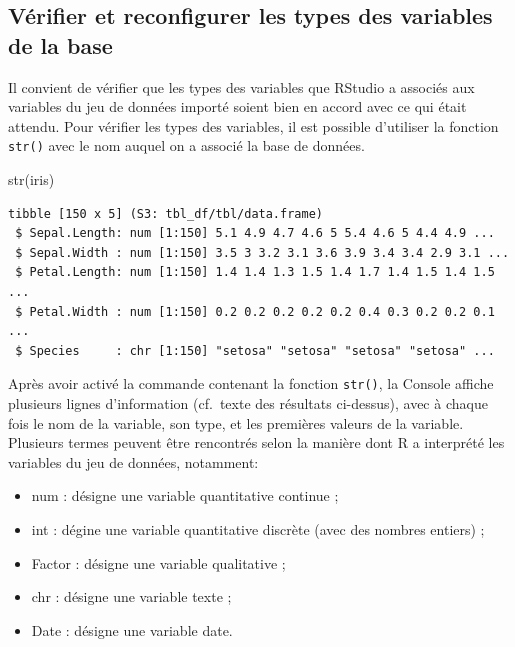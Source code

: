 \documentclass[
  letterpaper,
]{book}
\newenvironment{Shaded}{\begin{snugshade}}{\end{snugshade}}
\newcommand{\FunctionTok}[1]{\textcolor[rgb]{0.28,0.35,0.67}{#1}}
\newcommand{\NormalTok}[1]{\textcolor[rgb]{0.00,0.23,0.31}{#1}}
\providecommand{\tightlist}{%
  \setlength{\itemsep}{0pt}\setlength{\parskip}{0pt}}\usepackage{longtable,booktabs,array}
\begin{document}
\subsection{Vérifier et reconfigurer les types des variables de la
base}\label{vuxe9rifier-et-reconfigurer-les-types-des-variables-de-la-base}

Il convient de vérifier que les types des variables que RStudio a
associés aux variables du jeu de données importé soient bien en accord
avec ce qui était attendu. Pour vérifier les types des variables, il est
possible d'utiliser la fonction \texttt{str()} avec le nom auquel on a
associé la base de données.

\begin{Shaded}
\begin{Highlighting}[]
\FunctionTok{str}\NormalTok{(iris)}
\end{Highlighting}
\end{Shaded}

\begin{verbatim}
tibble [150 x 5] (S3: tbl_df/tbl/data.frame)
 $ Sepal.Length: num [1:150] 5.1 4.9 4.7 4.6 5 5.4 4.6 5 4.4 4.9 ...
 $ Sepal.Width : num [1:150] 3.5 3 3.2 3.1 3.6 3.9 3.4 3.4 2.9 3.1 ...
 $ Petal.Length: num [1:150] 1.4 1.4 1.3 1.5 1.4 1.7 1.4 1.5 1.4 1.5 ...
 $ Petal.Width : num [1:150] 0.2 0.2 0.2 0.2 0.2 0.4 0.3 0.2 0.2 0.1 ...
 $ Species     : chr [1:150] "setosa" "setosa" "setosa" "setosa" ...
\end{verbatim}

Après avoir activé la commande contenant la fonction \texttt{str()}, la
Console affiche plusieurs lignes d'information (cf.~texte des résultats
ci-dessus), avec à chaque fois le nom de la variable, son type, et les
premières valeurs de la variable. Plusieurs termes peuvent être
rencontrés selon la manière dont R a interprété les variables du jeu de
données, notamment:

\begin{itemize}
\tightlist
\item
  num : désigne une variable quantitative continue ;
\item
  int : dégine une variable quantitative discrète (avec des nombres
  entiers) ;
\item
  Factor : désigne une variable qualitative ;
\item
  chr : désigne une variable texte ;
\item
  Date : désigne une variable date.
\end{itemize}
\end{document}
